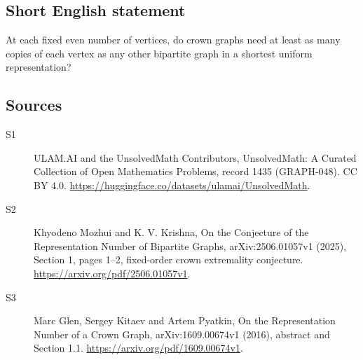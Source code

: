 \documentclass[11pt]{article}
\begin{document}
\subsection{Short English statement}
At each fixed even number of vertices, do crown graphs need at least as many copies of each vertex as any other bipartite graph in a shortest uniform representation?
\subsection{Sources}
\begin{description}
\item[\hypertarget{source:1435:1}{S1}] ULAM.AI and the UnsolvedMath Contributors, UnsolvedMath: A Curated Collection of Open Mathematics Problems, record 1435 (GRAPH-048). CC BY 4.0. \url{https://huggingface.co/datasets/ulamai/UnsolvedMath}.
\item[\hypertarget{source:1435:2}{S2}] Khyodeno Mozhui and K. V. Krishna, On the Conjecture of the Representation Number of Bipartite Graphs, arXiv:2506.01057v1 (2025), Section 1, pages 1--2, fixed-order crown extremality conjecture. \url{https://arxiv.org/pdf/2506.01057v1}.
\item[\hypertarget{source:1435:3}{S3}] Marc Glen, Sergey Kitaev and Artem Pyatkin, On the Representation Number of a Crown Graph, arXiv:1609.00674v1 (2016), abstract and Section 1.1. \url{https://arxiv.org/pdf/1609.00674v1}.
\end{description}
\label{end:1435}
\end{document}

